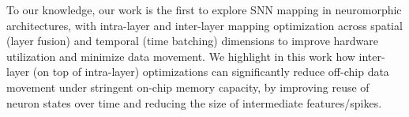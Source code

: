 To our knowledge, our work is the first to explore SNN mapping in neuromorphic architectures, with intra-layer and inter-layer mapping optimization across spatial (layer fusion) and temporal (time batching) dimensions to improve hardware utilization and minimize data movement. We highlight in this work how inter-layer (on top of intra-layer) optimizations can significantly reduce off-chip data movement under stringent on-chip memory capacity, by improving reuse of neuron states over time and reducing the size of intermediate features/spikes.